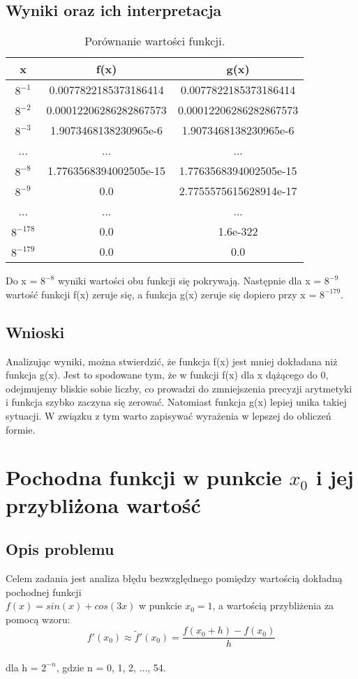 \documentclass{article}
\begin{document}
\subsection{Wyniki oraz ich interpretacja}
\begin{table}[H]
\centering
\begin{tabular}{|c|c|c|}
\hline
	x & f(x) & g(x)\\
\hline
	$8^{-1}$ & 0.0077822185373186414 & 0.0077822185373186414\\
\hline
	$8^{-2}$ & 0.00012206286282867573 & 0.00012206286282867573\\
\hline
	$8^{-3}$ & 1.9073468138230965e-6 & 1.9073468138230965e-6\\
\hline
	... & ... & ...\\
\hline
	$8^{-8}$ & 1.7763568394002505e-15 & 1.7763568394002505e-15\\
\hline
	$8^{-9}$ & 0.0 & 2.7755575615628914e-17\\
\hline
	... & ... & ...\\
\hline
	$8^{-178}$ & 0.0 & 1.6e-322\\
\hline
	$8^{-179}$ & 0.0 & 0.0\\
\hline
\end{tabular}
\caption{Porównanie wartości funkcji.}
\end{table}
Do x = $8^{-8}$ wyniki wartości obu funkcji się pokrywają. Następnie dla x = $8^{-9}$ wartość funkcji f(x) zeruje się, a funkcja g(x) zeruje się dopiero przy x = $8^{-179}$. 
\subsection{Wnioski}
Analizując wyniki, można stwierdzić, że funkcja f(x) jest mniej dokładana niż funkcja g(x). Jest to spodowane tym, że w funkcji f(x) dla x dążącego do 0, odejmujemy bliskie sobie liczby, co prowadzi do zmniejszenia precyzji arytmetyki i funkcja szybko zaczyna się zerować. Natomiast funkcja g(x) lepiej unika takiej sytuacji. W związku z tym warto zapisywać wyrażenia w lepszej do obliczeń formie.
\section{Pochodna funkcji w punkcie ${x_0}$ i jej przybliżona wartość}
\subsection{Opis problemu}
Celem zadania jest analiza błędu bezwzględnego pomiędzy wartością dokładną pochodnej funkcji \\ $f(x) = sin(x) + cos(3x)$ w punkcie ${x_0}  = 1$, a wartością przybliżenia za pomocą wzoru:
\[
f'(x_0) \approx \tilde{f}'(x_0) = \frac{f(x_0 + h) - f(x_0)}{h}
\]
\\ dla h = $2^{-n}$, gdzie n = 0, 1, 2, ..., 54.
\end{document}

